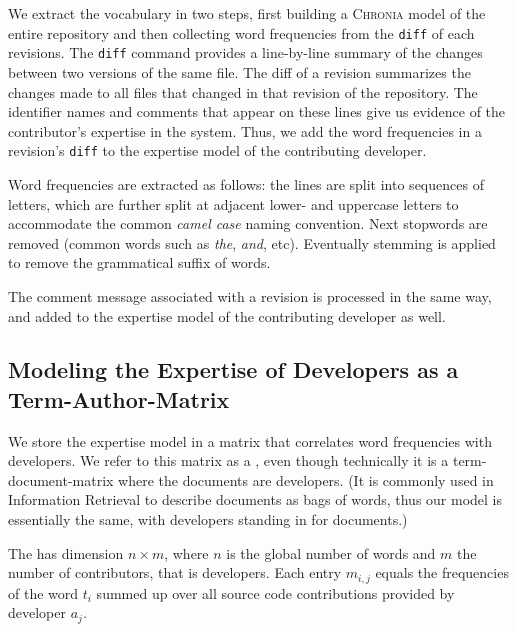 We extract the vocabulary in two steps, first building a \textsc{Chronia} model of the entire repository \cite{Girb05c} and then collecting word frequencies from the \verb$diff$ of each revisions. %
The \verb$diff$ command provides a line-by-line summary of the changes between two versions of the same file. The diff of a revision summarizes the changes made to all files that changed in that revision of the repository. The identifier names and comments that appear on these lines give us evidence of the contributor's expertise in the system. Thus, we add the word frequencies in a revision's \verb$diff$ to the expertise model of the contributing developer.

Word frequencies are extracted as follows: the lines are split into sequences of letters, which are further split at adjacent lower- and uppercase letters to accommodate the common \emph{camel case} naming convention. Next stopwords are removed (\ie common words such as \emph{the}, \emph{and}, etc). Eventually stemming %
is applied to remove the grammatical suffix of words.

The comment message associated with a revision is processed in the same way, and added to the expertise model of the contributing developer as well. 

\subsection{Modeling the Expertise of Developers as a Term-Author-Matrix}

We store the expertise model in a matrix that correlates word frequencies with developers. We refer to this matrix as a \TAM, even though technically it is a term-document-matrix where the documents are developers. (It is commonly used in Information Retrieval to describe documents as bags of words, thus our model is essentially the same, with developers standing in for documents.)

The \TAM has dimension $n \times m$, where $n$ is the global number of words and $m$ the number of contributors, that is developers. Each entry $m_{i,j}$ equals the frequencies of the word $t_i$ summed up over all source code contributions provided by developer $a_j$.

